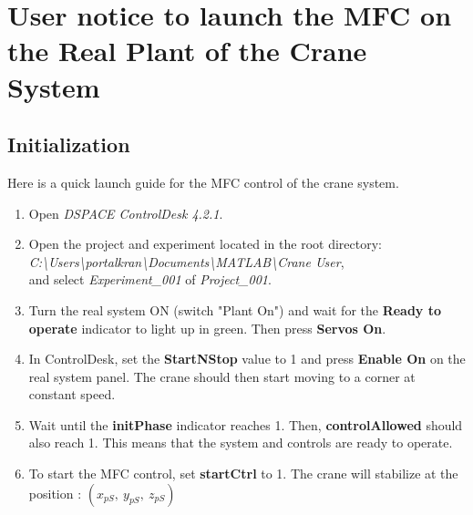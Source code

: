 \chapter{User notice to launch the MFC on the Real Plant of the Crane System}
\label{app:Dspace_implementation}
\section*{Initialization}
Here is a quick launch guide for the MFC control of the crane system.
\begin{enumerate}
    \item Open \textit{DSPACE ControlDesk 4.2.1}.
    
    \item Open the project and experiment located in the root directory:\\
    \textit{C:\textbackslash Users\textbackslash portalkran\textbackslash Documents\textbackslash MATLAB\textbackslash Crane User},\\
    and select \textit{Experiment\_001} of \textit{Project\_001}.
    
    \item Turn the real system ON (switch "Plant On") and wait for the \textbf{Ready to operate} indicator to light up in green. Then press \textbf{Servos On}.
    
    \item In ControlDesk, set the \textbf{StartNStop} value to 1 and press \textbf{Enable On} on the real system panel. The crane should then start moving to a corner at constant speed.
    
    \item Wait until the \textbf{initPhase} indicator reaches 1. Then, \textbf{controlAllowed} should also reach 1. This means that the system and controls are ready to operate.
    
    \item To start the MFC control, set \textbf{startCtrl} to 1. The crane will stabilize at the position : \((x_{pS},\ y_{pS},\ z_{pS})\)
\end{enumerate}
